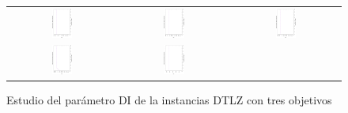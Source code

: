 \begin{figure}[h]
\centering
\caption{Estudio del parámetro DI de la instancias DTLZ con tres objetivos}
\label{fig:Scalability_Study_HV_1}
\begin{tabular}{ccc}
   \includegraphics[width=0.2\textwidth, angle=-90,origin=c]{Figures_Chapter7/Results_Chapter3/EPS_DI/3obj_DTLZ1.eps} &
   \includegraphics[width=0.2\textwidth, angle=-90,origin=c]{Figures_Chapter7/Results_Chapter3/EPS_DI/3obj_DTLZ2.eps} &
   \includegraphics[width=0.2\textwidth,angle=-90,origin=c]{Figures_Chapter7/Results_Chapter3/EPS_DI/3obj_DTLZ3.eps}  
    \\ 
   \includegraphics[width=0.2\textwidth, angle=-90,origin=c]{Figures_Chapter7/Results_Chapter3/EPS_DI/3obj_DTLZ4.eps} &
   \includegraphics[width=0.2\textwidth, angle=-90,origin=c]{Figures_Chapter7/Results_Chapter3/EPS_DI/3obj_DTLZ5.eps} &

\end{tabular}
\end{figure}

